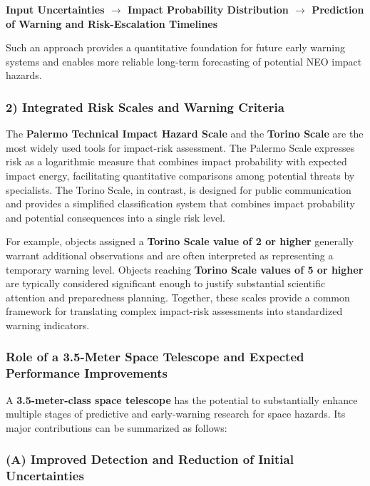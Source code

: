 \textbf{Input Uncertainties $\rightarrow$ Impact Probability Distribution $\rightarrow$ Prediction of Warning and Risk-Escalation Timelines}

Such an approach provides a quantitative foundation for future early warning systems and enables more reliable long-term forecasting of potential NEO impact hazards.

\subsubsection{2) Integrated Risk Scales and Warning Criteria}\label{integrated-risk-scales-and-warning-criteria}

The \textbf{Palermo Technical Impact Hazard Scale} and the \textbf{Torino Scale} are the most widely used tools for impact-risk assessment. The Palermo Scale expresses risk as a logarithmic measure that combines impact probability with expected impact energy, facilitating quantitative comparisons among potential threats by specialists. The Torino Scale, in contrast, is designed for public communication and provides a simplified classification system that combines impact probability and potential consequences into a single risk level.

For example, objects assigned a \textbf{Torino Scale value of 2 or higher} generally warrant additional observations and are often interpreted as representing a temporary warning level. Objects reaching \textbf{Torino Scale values of 5 or higher} are typically considered significant enough to justify substantial scientific attention and preparedness planning. Together, these scales provide a common framework for translating complex impact-risk assessments into standardized warning indicators.

\subsubsection{Role of a 3.5-Meter Space Telescope and Expected Performance Improvements}

A \textbf{3.5-meter-class space telescope} has the potential to substantially enhance multiple stages of predictive and early-warning research for space hazards. Its major contributions can be summarized as follows:

\subsubsection{(A) Improved Detection and Reduction of Initial Uncertainties}\label{a-improved-detection-and-reduction-of-initial-uncertainties}

